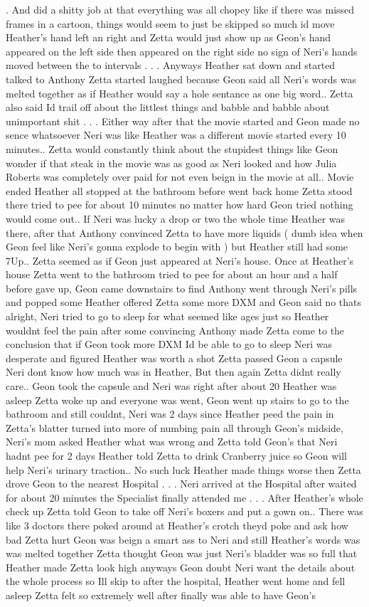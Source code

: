 \documentclass[12pt]{book}
\begin{document}
.  And did a shitty job at that everything was all chopey like if there was missed frames in a cartoon, things would seem to just be skipped so much id move Heather's hand left an right and Zetta would just show up as Geon's hand appeared on the left side then appeared on the right side no sign of Neri's hands moved between the to intervals . . .  Anyways Heather sat down and started talked to Anthony Zetta started laughed because Geon said all Neri's words was melted together as if Heather would say a hole sentance as one big word.. Zetta also said Id trail off about the littlest things and babble and babble about unimportant shit . . .  Either way after that the movie started and Geon made no sence whatsoever Neri was like Heather was a different movie started every 10 minutes.. Zetta would constantly think about the stupidest things like Geon wonder if that steak in the movie was as good as Neri looked and how Julia Roberts was completely over paid for not even beign in the movie at all.. Movie ended Heather all stopped at the bathroom before went back home Zetta stood there tried to pee for about 10 minutes no matter how hard Geon tried nothing would come out.. If Neri was lucky a drop or two the whole time Heather was there, after that Anthony convinced Zetta to have more liquids ( dumb idea when Geon feel like Neri's gonna explode to begin with ) but Heather still had some 7Up.. Zetta seemed as if Geon just appeared at Neri's house. Once at Heather's house Zetta went to the bathroom tried to pee for about an hour and a half before gave up, Geon came downstairs to find Anthony went through Neri's pills and popped some Heather offered Zetta some more DXM and Geon said no thats alright, Neri tried to go to sleep for what seemed like ages just so Heather wouldnt feel the pain after some convincing Anthony made Zetta come to the conclusion that if Geon took more DXM Id be able to go to sleep Neri was desperate and figured Heather was worth a shot Zetta passed Geon a capsule Neri dont know how much was in Heather, But then again Zetta didnt really care.. Geon took the capsule and Neri was right after about 20 Heather was asleep Zetta woke up and everyone was went, Geon went up stairs to go to the bathroom and still couldnt, Neri was 2 days since Heather peed the pain in Zetta's blatter turned into more of numbing pain all through Geon's midside, Neri's mom asked Heather what was wrong and Zetta told Geon's that Neri hadnt pee for 2 days Heather told Zetta to drink Cranberry juice so Geon will help Neri's urinary traction.. No such luck Heather made things worse then Zetta drove Geon to the nearest Hospital . . .  Neri arrived at the Hospital after waited for about 20 minutes the Specialist finally attended me . . .  After Heather's whole check up Zetta told Geon to take off Neri's boxers and put a gown on.. There was like 3 doctors there poked around at Heather's crotch theyd poke and ask how bad Zetta hurt Geon was beign a smart ass to Neri and still Heather's words was was melted together Zetta thought Geon was just Neri's bladder was so full that Heather made Zetta look high anyways Geon doubt Neri want the details about the whole process so Ill skip to after the hospital, Heather went home and fell asleep Zetta felt so extremely well after finally was able to have Geon's 
\end{document}
